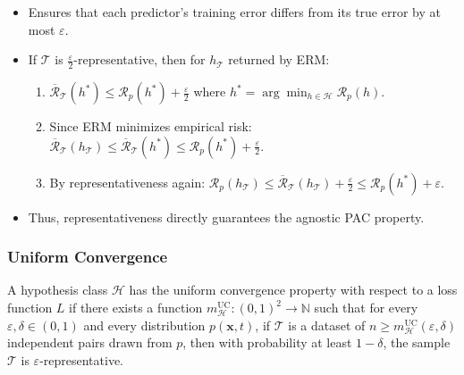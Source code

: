 \begin{itemize}
    \item Ensures that each predictor's training error differs from its true error by at most $\varepsilon$.
    \item If $\mathcal{T}$ is $\frac{\varepsilon}{2}$-representative, then for $h_{\mathcal{T}}$ returned by ERM:
    \begin{enumerate}
        \item $\overline{\mathcal{R}}_{\mathcal{T}}(h^*) \leq \mathcal{R}_p(h^*) + \frac{\varepsilon}{2}$ where $h^* = \arg\min_{h \in \mathcal{H}} \mathcal{R}_p(h)$.
        \item Since ERM minimizes empirical risk: $\overline{\mathcal{R}}_{\mathcal{T}}(h_{\mathcal{T}}) \leq \overline{\mathcal{R}}_{\mathcal{T}}(h^*) \leq \mathcal{R}_p(h^*) + \frac{\varepsilon}{2}$.
        \item By representativeness again: $\mathcal{R}_p(h_{\mathcal{T}}) \leq \overline{\mathcal{R}}_{\mathcal{T}}(h_{\mathcal{T}}) + \frac{\varepsilon}{2} \leq \mathcal{R}_p(h^*) + \varepsilon$.
    \end{enumerate}
    \item Thus, representativeness directly guarantees the agnostic PAC property.
\end{itemize}

\subsubsection*{Uniform Convergence}
\begin{definition}
A hypothesis class $\mathcal{H}$ has the \alert{uniform convergence} property with respect to a loss function $L$ if there exists a function $m_{\mathcal{H}}^{\text{UC}}: (0,1)^2 \to \mathbb{N}$ such that for every $\varepsilon, \delta \in (0,1)$ and every distribution $p(\mathbf{x}, t)$, if $\mathcal{T}$ is a dataset of $n \geq m_{\mathcal{H}}^{\text{UC}}(\varepsilon, \delta)$ independent pairs drawn from $p$, then with probability at least $1 - \delta$, the sample $\mathcal{T}$ is $\varepsilon$-representative.
\end{definition}

